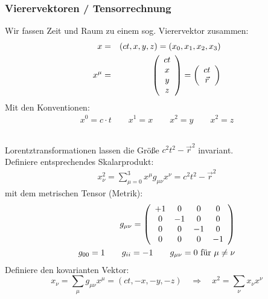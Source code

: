 \subsubsection{Vierervektoren / Tensorrechnung}
Wir fassen Zeit und Raum zu einem sog. Vierervektor zusammen:
\begin{eqnarray*}
x &=& (ct,x,y,z) = (x_0,x_1,x_2,x_3)\\
x^{\mu} &=& \left ( \begin{array}{c} ct\\ x\\y\\z\end{array} \right) = \left ( \begin{array}{c} ct\\ \vec r \end{array}\right )
\end{eqnarray*}
Mit den Konventionen:
\begin{eqnarray*}
x^ 0 = c\cdot t \qquad x^ 1 = x \qquad x^ 2 = y \qquad x^ 2 = z
\end{eqnarray*}
\begin{center}
\begin{tabular}{cccccc}
\end{tabular}\end{center}
Lorentztransformationen lassen die Größe $c^ 2t^ 2 - \vec r^ 2$ invariant.\\
Definiere entsprechendes Skalarprodukt:
\begin{eqnarray*}
x^ 2_{\nu} = \sum \limits_{\mu = 0}^ 3 x^ {\mu} g_{\mu \nu} x^ {\nu} = c^ 2t^ 2- \vec r^ 2
\end{eqnarray*}
mit dem metrischen Tensor (Metrik):
\begin{eqnarray*}
g_{\mu\nu} = \left ( \begin{array}{cccc} +1&0&0&0\\0&-1&0&0\\0&0&-1&0\\0&0&0&-1\end{array} \right)\\
g_{00} = 1 \qquad g_{ii} = -1 \qquad g_{\mu\nu} = 0 \text{ für  } \mu \neq \nu
\end{eqnarray*}
Definiere den kovarianten Vektor:
\begin{equation*}
 x_{\nu}=\sum_{\mu}g_{\mu\nu}x^{\mu}=(ct,-x,-y,-z)\quad\Rightarrow\quad x^2=\sum_{\nu}x_{\nu}x^{\nu}
\end{equation*}

